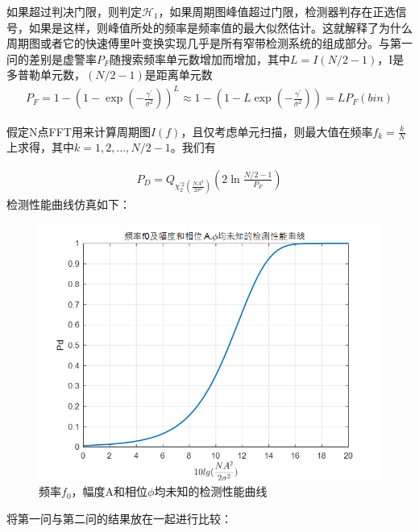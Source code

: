 \documentclass[fontset=windows]{article}
\numberwithin{figure}{section}
\begin{document}
如果超过判决门限，则判定\(\mathcal{H}_1\)，如果周期图峰值超过门限，检测器判存在正选信号，如果是这样，则峰值所处的频率是频率值的最大似然估计。这就解释了为什么周期图或者它的快速傅里叶变换实现几乎是所有窄带检测系统的组成部分。与第一问的差别是虚警率\(P_F\)随搜索频率单元数增加而增加，其中\(L=I(N/2-1)\)，I是多普勒单元数，\((N/2-1)\)是距离单元数
\begin{align*}
	P_F=1-(1-\exp(-\frac{\gamma^{\prime}}{\sigma^2}))^L\approx 1-(1-L\exp(-\frac{\gamma^{\prime}}{\sigma^2}))=LP_F(bin)
\end{align*}

假定N点FFT用来计算周期图\(I(f)\)，且仅考虑单元扫描，则最大值在频率\(f_k=\frac{k}{N}\)上求得，其中\(k=1,2,\ldots, N/2-1\)。我们有

\begin{align*}
	P_D=Q_{\chi^{\prime2}_2(\frac{NA^2}{2\sigma^2})}(2\ln \frac{N/2-1}{P_F})
\end{align*}
检测性能曲线仿真如下：

\begin{figure}[H]
	\centering
	\includegraphics[scale=0.7]{4.2.png}
	\caption{频率\(f_0\)，幅度A和相位\(\phi\)均未知的检测性能曲线}
	\label{5.4.2}
\end{figure}

将第一问与第二问的结果放在一起进行比较：
\end{document}
